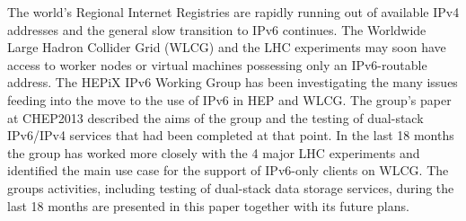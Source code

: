 The world's Regional Internet Registries are rapidly running out of available IPv4 addresses and the 
general slow transition to IPv6 continues. The Worldwide Large Hadron Collider Grid (WLCG) and the LHC experiments 
may soon have access to worker nodes or virtual machines possessing only an IPv6-routable address. The HEPiX
IPv6 Working Group \cite{ipv6wg} has been investigating the many issues feeding into the move to the use of IPv6 in HEP and WLCG.
The group's paper at CHEP2013 \cite{ipv6chep2013} described the aims of the group and the testing of dual-stack IPv6/IPv4 
services that had been completed at that point. In the last 18 months the group has worked more closely with the
4 major LHC experiments and identified the main use case for the support of IPv6-only clients on WLCG. The groups
activities, including testing of dual-stack data storage services, during the last 18 months are presented in this 
paper together with its future plans.